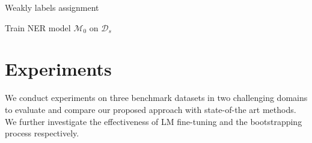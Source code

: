 \documentclass[10pt, conference, compsocconf]{IEEEtran}
\newcommand{\Scierc}{\textsc{S}ci-\textsc{erc}\xspace}
\begin{document}
\begin{algorithm}[h]
    \caption{Weakly labels assignment}
    \label{alg:method}
    \SetAlgoNoLine
        Train NER model $\mathcal{M}_0$ on $\mathcal{D}_{s}$
        \\
  \end{algorithm}

\section{Experiments}
We conduct experiments on three benchmark
datasets in two challenging domains to evaluate and compare our proposed approach
with state-of-the art methods.  We further investigate the effectiveness of LM fine-tuning 
and the bootstrapping process respectively.

\end{document}

